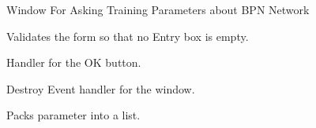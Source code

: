 \documentclass[letterpaper,10pt,english]{sphinxmanual}
\begin{document}
\begin{fulllineitems}
\label{index:train_window.train_window}
Window For Asking Training Parameters about BPN Network


\begin{fulllineitems}
\label{index:train_window.train_window.Validate_form}
Validates the form so that no Entry box is empty.

\end{fulllineitems}



\begin{fulllineitems}
\label{index:train_window.train_window.on_ok}
Handler for the OK button.

\end{fulllineitems}



\begin{fulllineitems}
\label{index:train_window.train_window.on_train_window_destroy}
Destroy Event handler for the window.

\end{fulllineitems}



\begin{fulllineitems}
\label{index:train_window.train_window.pack_param}
Packs parameter into a list.

\end{fulllineitems}


\end{fulllineitems}

\label{index:module-train}
\end{document}
